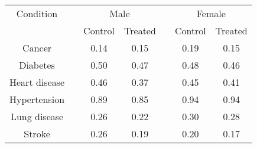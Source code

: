 \begin{tabular}{ccccccc}
\hline \hline
Condition && \multicolumn{2}{c}{Male} &  & \multicolumn{2}{c}{Female}\\
& & Control & Treated & & Control & Treated \\ \hline
Cancer&&0.14&0.15&&0.19&0.15\\
Diabetes&&0.50&0.47&&0.48&0.46\\
Heart disease&&0.46&0.37&&0.45&0.41\\
Hypertension&&0.89&0.85&&0.94&0.94\\
Lung disease&&0.26&0.22&&0.30&0.28\\
Stroke&&0.26&0.19&&0.20&0.17\\
\hline \hline
\end{tabular}
